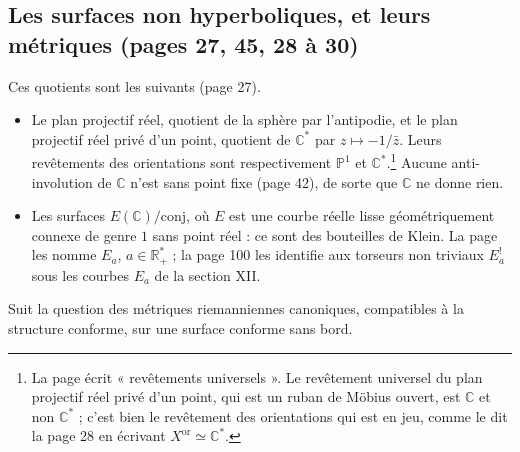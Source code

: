 \documentclass[11pt,a4paper]{article}
\begin{document}
\subsection*{Les surfaces non hyperboliques, et leurs métriques (pages 27, 45, 28 à 30)}

Ces quotients sont les suivants (page 27).

\begin{itemize}
  \item[a)] Le plan projectif réel, quotient de la sphère par l'antipodie, et
  le plan projectif réel privé d'un point, quotient de $\mathbb{C}^{*}$ par
  $z \mapsto -1/\bar z$. Leurs revêtements des orientations sont
  respectivement $\mathbb{P}^{1}$ et $\mathbb{C}^{*}$.\footnote{La page écrit
  « revêtements universels ». Le revêtement universel du plan projectif réel
  privé d'un point, qui est un ruban de Möbius ouvert, est $\mathbb{C}$ et non
  $\mathbb{C}^{*}$ ; c'est bien le revêtement des orientations qui est en
  jeu, comme le dit la page 28 en écrivant $X^{\mathrm{or}} \simeq
  \mathbb{C}^{*}$.} Aucune anti-involution de $\mathbb{C}$ n'est sans point
  fixe (page 42), de sorte que $\mathbb{C}$ ne donne rien.
  \item[b)] Les surfaces $E(\mathbb{C})/\text{conj}$, où $E$ est une courbe
  réelle lisse géométriquement connexe de genre $1$ sans point réel : ce sont
  des bouteilles de Klein. La page les nomme $E_a$, $a \in \mathbb{R}^{*}_{+}$ ;
  la page 100 les identifie aux torseurs non triviaux $E_a^{!}$ sous les
  courbes $E_a$ de la section XII.
\end{itemize}

Suit la question des métriques riemanniennes canoniques, compatibles à la
structure conforme, sur une surface conforme sans bord.
\end{document}

